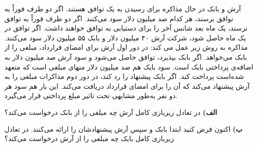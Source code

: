 آرش و بابک در حال مذاکره برای رسیدن به یک توافق هستند. اگر دو طرف فوراً به توافق برسند، هر کدام صد میلیون دلار سود می‌کنند. اگر دو طرف فوراً به توافق نرسند، یک ماه بعد شانس آخر را برای دستیابی به توافق خواهند داشت. اگر توافق در یک ماه حاصل شود، شرکت آرش ۴۰ میلیون دلار و بابک ۵۵ میلیون دلار سود می‌کنند.
مذاکره به روش زیر عمل می کند: در دور اول آرش برای امضای قرارداد، مبلغی را از بابک می‌خواهد. اگر بابک بپذیرد، توافق حاصل می‌شود و سود آرش صد میلیون دلار به اضافه‌ی پرداختی بابک است. سود بابک هم صد میلیون دلار منهای مبلغی است که متعهد شده‌است پرداخت کند.
اگر بابک پیشنهاد را رد کند، در دور دوم مذاکرات مبلغی را به آرش پیشنهاد می‌کند که آن را برای امضای قرارداد دریافت می‌کند. این بار هم سود هر دو نفر به‌طور مشابهی تحت تاثیر مبلغ پرداختی قرار می‌گیرد.
\vspace{10pt}

\textbf{الف)}
در تعادل زیربازی کامل آرش چه مبلغی را از بابک درخواست می‌کند؟
\vspace{5pt}

\textbf{ب)}
اکنون فرض کنید ابتدا بابک و سپس آرش پیشنهادشان را ارائه می‌کنند. در تعادل زیربازی کامل بابک چه مبلغی را از آرش درخواست می‌کند؟
